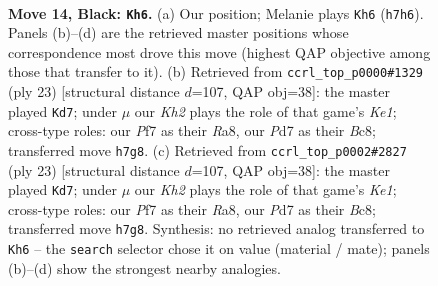 \documentclass[11pt]{article}
\begin{document}
\clearpage

\begin{figure}[p]\centering
\begin{subfigure}{0.46\textwidth}\centering
\resizebox{\linewidth}{!}{%
\newchessgame
\chessboard[
  setfen={r1b2r2/p1ppqppk/2n1pn2/1Qp3Np/3P4/2B3P1/PP1KPP1P/R4B1R b - - 1 14},
  showmover=false,
  pgfstyle=straightmove, color=movearrow, markmove={h7-h6}
]}
\caption{}
\end{subfigure}\hfill
\begin{subfigure}{0.46\textwidth}\centering
\resizebox{\linewidth}{!}{%
\newchessgame
\chessboard[
  setfen={r1bqkb1r/ppp1pQ1p/1n1p2p1/1n4N1/8/8/PPP2PPP/R1B1KB1R b KQ - 2 12},
  showmover=false,
  pgfstyle=straightmove, color=movearrow, markmove={e8-d7}
]}
\caption{}
\end{subfigure}
\\[4pt]
\begin{subfigure}{0.46\textwidth}\centering
\resizebox{\linewidth}{!}{%
\newchessgame
\chessboard[
  setfen={r1bqkb1r/ppp1pQ1p/1n1p2p1/1n4N1/8/8/PPP2PPP/R1B1KB1R b KQ - 2 12},
  showmover=false,
  pgfstyle=straightmove, color=movearrow, markmove={e8-d7}
]}
\caption{}
\end{subfigure}\hfill

\caption{\textbf{Move 14, Black: \texttt{Kh6}.} (a) Our position; Melanie plays \texttt{Kh6} (\texttt{h7h6}). Panels (b)--(d) are the retrieved master positions whose correspondence most drove this move (highest QAP objective among those that transfer to it). (b) Retrieved from \texttt{ccrl\_top\_p0000\#1329} (ply 23) [structural distance $d$=107, QAP obj=38]: the master played \texttt{Kd7}; under $\mu$ our \emph{Kh2} plays the role of that game's \emph{Ke1}; cross-type roles: our \emph{P}f7 as their \emph{R}a8, our \emph{P}d7 as their \emph{B}c8; transferred move \texttt{h7g8}. (c) Retrieved from \texttt{ccrl\_top\_p0002\#2827} (ply 23) [structural distance $d$=107, QAP obj=38]: the master played \texttt{Kd7}; under $\mu$ our \emph{Kh2} plays the role of that game's \emph{Ke1}; cross-type roles: our \emph{P}f7 as their \emph{R}a8, our \emph{P}d7 as their \emph{B}c8; transferred move \texttt{h7g8}. Synthesis: no retrieved analog transferred to \texttt{Kh6} -- the \texttt{search} selector chose it on value (material / mate); panels (b)--(d) show the strongest nearby analogies.}
\label{fig:thought-m27}
\end{figure}

\clearpage
\end{document}
